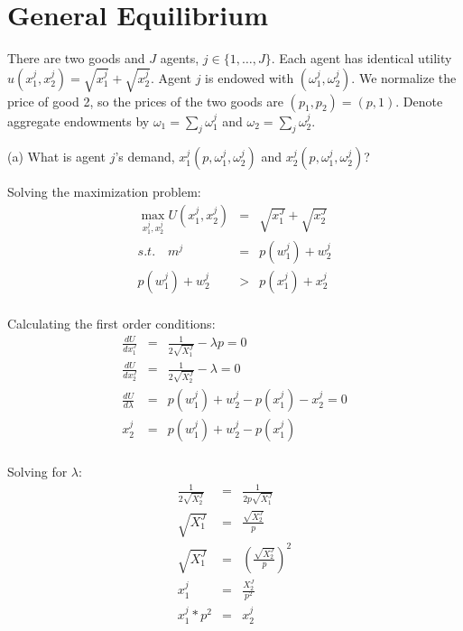 \section{General Equilibrium}

There are two goods and \( J \) agents, \( j \in \{1, \ldots, J\} \). Each agent has identical utility \( u(x^j_1, x^j_2) = \sqrt{x^j_1} + \sqrt{x^j_2} \). Agent \( j \) is endowed with \( (\omega^j_1, \omega^j_2) \). We normalize the price of good 2, so the prices of the two goods are \( (p_1, p_2) = (p, 1) \). Denote aggregate endowments by \( \omega_1 = \sum_j \omega^j_1 \) and \( \omega_2 = \sum_j \omega^j_2 \).


\begin{tcolorbox}
    (a) What is agent \( j \)'s demand, \( x^j_1(p, \omega^j_1, \omega^j_2) \) and \( x^j_2(p, \omega^j_1, \omega^j_2) \)?
\end{tcolorbox}

Solving the maximization problem:
\begin{eqnarray*}
\max_{x_1^j, x_2^j} U(x_1^j,x_2^j)&=&\sqrt{x_1^J}+\sqrt{x_2^J}\\
s.t. \quad m^j&=&p(w_1^j)+w_2^j\\
p(w_1^j)+w_2^j&>&p(x_1^j)+x_2^j\\
\end{eqnarray*}

Calculating the first order conditions:
\begin{eqnarray*}
\frac{dU}{dx_1^J}&=&\frac{1}{2\sqrt{X_1^J}}-λp=0\\
\frac{dU}{dx_2^J}&=&\frac{1}{2\sqrt{X_2^J}}-λ=0\\
\frac{dU}{dλ}&=&p(w_1^j)+w_2^j-p(x_1^j)-x_2^j=0\\
x_2^j&=&p(w_1^j)+w_2^j-p(x_1^j)\\
\end{eqnarray*}

Solving for $\lambda$:
\begin{eqnarray*}
\frac{1}{2\sqrt{X_2^J}}&=&\frac{1}{2p\sqrt{X_1^J}}\\
\sqrt{X_1^J}&=&\frac{\sqrt{X_2^J}}{p}\\
\sqrt{X_1^J}&=&(\frac{\sqrt{X_2^J}}{p})^2\\
x_1^j&=&\frac{X_2^J}{p^2}\\
x_1^j*p^2&=&x_2^j\\
\end{eqnarray*}


